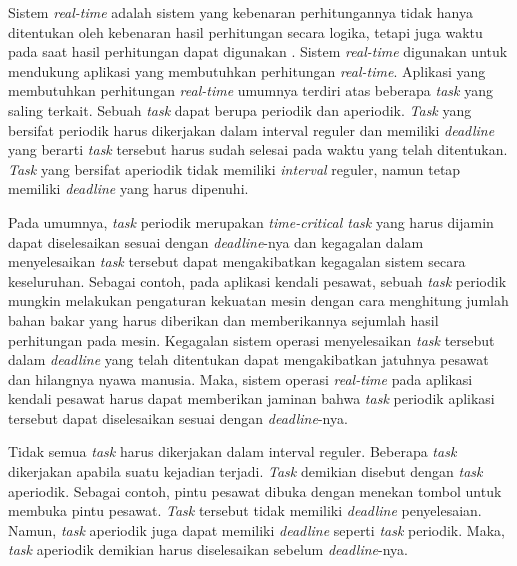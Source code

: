 Sistem \textit{real-time} adalah sistem yang kebenaran perhitungannya tidak hanya ditentukan
oleh kebenaran hasil perhitungan secara logika, tetapi juga waktu pada saat hasil perhitungan
dapat digunakan \citep[pp.~6-7]{Shin1994}.  Sistem \textit{real-time} digunakan untuk mendukung
aplikasi yang membutuhkan perhitungan \textit{real-time}.  Aplikasi yang membutuhkan perhitungan
\textit{real-time} umumnya terdiri atas beberapa \textit{task} yang saling terkait.  Sebuah
\textit{task} dapat berupa periodik dan aperiodik. \textit{Task} yang bersifat periodik harus
dikerjakan dalam interval reguler dan memiliki \textit{deadline} yang berarti \textit{task}
tersebut harus sudah selesai pada waktu yang telah ditentukan. \textit{Task} yang bersifat
aperiodik tidak memiliki \textit{interval} reguler, namun tetap memiliki \textit{deadline} yang
harus dipenuhi.

Pada umumnya, \textit{task} periodik merupakan \textit{time-critical task} yang harus dijamin
dapat diselesaikan sesuai dengan \textit{deadline}-nya dan kegagalan dalam menyelesaikan
\textit{task} tersebut dapat mengakibatkan kegagalan sistem secara keseluruhan.  Sebagai contoh,
pada aplikasi kendali pesawat, sebuah \textit{task} periodik mungkin melakukan pengaturan
kekuatan mesin dengan cara menghitung jumlah bahan bakar yang harus diberikan dan memberikannya
sejumlah hasil perhitungan pada mesin.  Kegagalan sistem operasi menyelesaikan \textit{task}
tersebut dalam \textit{deadline} yang telah ditentukan dapat mengakibatkan jatuhnya pesawat dan
hilangnya nyawa manusia.  Maka, sistem operasi \textit{real-time} pada aplikasi kendali pesawat
harus dapat memberikan jaminan bahwa \textit{task} periodik aplikasi tersebut dapat diselesaikan
sesuai dengan \textit{deadline}-nya.

Tidak semua \textit{task} harus dikerjakan dalam interval reguler. Beberapa \textit{task}
dikerjakan apabila suatu kejadian terjadi. \textit{Task} demikian disebut dengan \textit{task}
aperiodik.  Sebagai contoh, pintu pesawat dibuka dengan menekan tombol untuk membuka pintu
pesawat.  \textit{Task} tersebut tidak memiliki \textit{deadline} penyelesaian.  Namun,
\textit{task} aperiodik juga dapat memiliki \textit{deadline} seperti \textit{ task} periodik.
Maka, \textit{task} aperiodik demikian harus diselesaikan sebelum \textit{deadline}-nya.

